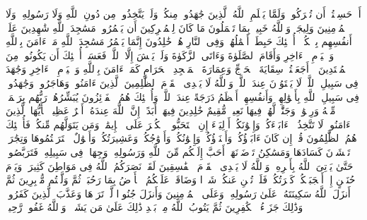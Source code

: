 \startbuffer[\q:9:16]
أَمۡ حَسِبۡتُمۡ أَن تُتۡرَكُوا۟ وَلَمَّا یَعۡلَمِ ٱللَّهُ ٱلَّذِینَ جَٰهَدُوا۟ مِنكُمۡ وَلَمۡ یَتَّخِذُوا۟ مِن دُونِ ٱللَّهِ وَلَا رَسُولِهِۦ وَلَا ٱلۡمُؤۡمِنِینَ وَلِیجَةࣰۚ وَٱللَّهُ خَبِیرُۢ بِمَا تَعۡمَلُونَ%
\stopbuffer%
\startbuffer[\q:9:17]
مَا كَانَ لِلۡمُشۡرِكِینَ أَن یَعۡمُرُوا۟ مَسَٰجِدَ ٱللَّهِ شَٰهِدِینَ عَلَىٰۤ أَنفُسِهِم بِٱلۡكُفۡرِۚ أُو۟لَٰۤئِكَ حَبِطَتۡ أَعۡمَٰلُهُمۡ وَفِی ٱلنَّارِ هُمۡ خَٰلِدُونَ%
\stopbuffer%
\startbuffer[\q:9:18]
إِنَّمَا یَعۡمُرُ مَسَٰجِدَ ٱللَّهِ مَنۡ ءَامَنَ بِٱللَّهِ وَٱلۡیَوۡمِ ٱلۡءَاخِرِ وَأَقَامَ ٱلصَّلَوٰةَ وَءَاتَى ٱلزَّكَوٰةَ وَلَمۡ یَخۡشَ إِلَّا ٱللَّهَۖ فَعَسَىٰۤ أُو۟لَٰۤئِكَ أَن یَكُونُوا۟ مِنَ ٱلۡمُهۡتَدِینَ%
\stopbuffer%
\startbuffer[\q:9:19]
۞ أَجَعَلۡتُمۡ سِقَایَةَ ٱلۡحَاۤجِّ وَعِمَارَةَ ٱلۡمَسۡجِدِ ٱلۡحَرَامِ كَمَنۡ ءَامَنَ بِٱللَّهِ وَٱلۡیَوۡمِ ٱلۡءَاخِرِ وَجَٰهَدَ فِی سَبِیلِ ٱللَّهِۚ لَا یَسۡتَوُۥنَ عِندَ ٱللَّهِۗ وَٱللَّهُ لَا یَهۡدِی ٱلۡقَوۡمَ ٱلظَّٰلِمِینَ%
\stopbuffer%
\startbuffer[\q:9:20]
ٱلَّذِینَ ءَامَنُوا۟ وَهَاجَرُوا۟ وَجَٰهَدُوا۟ فِی سَبِیلِ ٱللَّهِ بِأَمۡوَٰلِهِمۡ وَأَنفُسِهِمۡ أَعۡظَمُ دَرَجَةً عِندَ ٱللَّهِۚ وَأُو۟لَٰۤئِكَ هُمُ ٱلۡفَاۤئِزُونَ%
\stopbuffer%
\startbuffer[\q:9:21]
یُبَشِّرُهُمۡ رَبُّهُم بِرَحۡمَةࣲ مِّنۡهُ وَرِضۡوَٰنࣲ وَجَنَّٰتࣲ لَّهُمۡ فِیهَا نَعِیمࣱ مُّقِیمٌ%
\stopbuffer%
\startbuffer[\q:9:22]
خَٰلِدِینَ فِیهَاۤ أَبَدًاۚ إِنَّ ٱللَّهَ عِندَهُۥۤ أَجۡرٌ عَظِیمࣱ%
\stopbuffer%
\startbuffer[\q:9:23]
یَٰۤأَیُّهَا ٱلَّذِینَ ءَامَنُوا۟ لَا تَتَّخِذُوۤا۟ ءَابَاۤءَكُمۡ وَإِخۡوَٰنَكُمۡ أَوۡلِیَاۤءَ إِنِ ٱسۡتَحَبُّوا۟ ٱلۡكُفۡرَ عَلَى ٱلۡإِیمَٰنِۚ وَمَن یَتَوَلَّهُم مِّنكُمۡ فَأُو۟لَٰۤئِكَ هُمُ ٱلظَّٰلِمُونَ%
\stopbuffer%
\startbuffer[\q:9:24]
قُلۡ إِن كَانَ ءَابَاۤؤُكُمۡ وَأَبۡنَاۤؤُكُمۡ وَإِخۡوَٰنُكُمۡ وَأَزۡوَٰجُكُمۡ وَعَشِیرَتُكُمۡ وَأَمۡوَٰلٌ ٱقۡتَرَفۡتُمُوهَا وَتِجَٰرَةࣱ تَخۡشَوۡنَ كَسَادَهَا وَمَسَٰكِنُ تَرۡضَوۡنَهَاۤ أَحَبَّ إِلَیۡكُم مِّنَ ٱللَّهِ وَرَسُولِهِۦ وَجِهَادࣲ فِی سَبِیلِهِۦ فَتَرَبَّصُوا۟ حَتَّىٰ یَأۡتِیَ ٱللَّهُ بِأَمۡرِهِۦۗ وَٱللَّهُ لَا یَهۡدِی ٱلۡقَوۡمَ ٱلۡفَٰسِقِینَ%
\stopbuffer%
\startbuffer[\q:9:25]
لَقَدۡ نَصَرَكُمُ ٱللَّهُ فِی مَوَاطِنَ كَثِیرَةࣲ وَیَوۡمَ حُنَیۡنٍ إِذۡ أَعۡجَبَتۡكُمۡ كَثۡرَتُكُمۡ فَلَمۡ تُغۡنِ عَنكُمۡ شَیۡءࣰا وَضَاقَتۡ عَلَیۡكُمُ ٱلۡأَرۡضُ بِمَا رَحُبَتۡ ثُمَّ وَلَّیۡتُم مُّدۡبِرِینَ%
\stopbuffer%
\startbuffer[\q:9:26]
ثُمَّ أَنزَلَ ٱللَّهُ سَكِینَتَهُۥ عَلَىٰ رَسُولِهِۦ وَعَلَى ٱلۡمُؤۡمِنِینَ وَأَنزَلَ جُنُودࣰا لَّمۡ تَرَوۡهَا وَعَذَّبَ ٱلَّذِینَ كَفَرُوا۟ۚ وَذَٰلِكَ جَزَاۤءُ ٱلۡكَٰفِرِینَ%
\stopbuffer%
\startbuffer[\q:9:27]
ثُمَّ یَتُوبُ ٱللَّهُ مِنۢ بَعۡدِ ذَٰلِكَ عَلَىٰ مَن یَشَاۤءُۗ وَٱللَّهُ غَفُورࣱ رَّحِیمࣱ%
